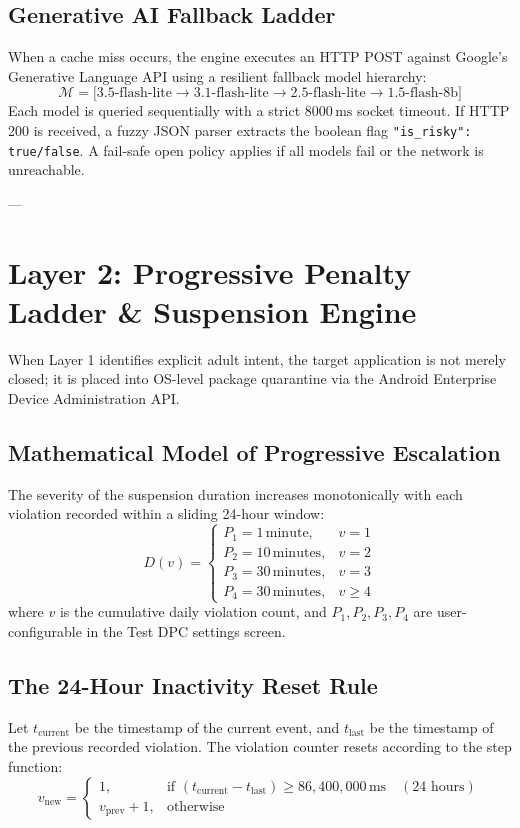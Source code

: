 \documentclass[11pt,a4paper]{article}
\begin{document}
\subsection{Generative AI Fallback Ladder}
When a cache miss occurs, the engine executes an HTTP POST against Google's Generative Language API using a resilient fallback model hierarchy:
\begin{equation}
\mathcal{M} = \big[ \text{3.5-flash-lite} \longrightarrow \text{3.1-flash-lite} \longrightarrow \text{2.5-flash-lite} \longrightarrow \text{1.5-flash-8b} \big]
\end{equation}
Each model is queried sequentially with a strict $8000\,\text{ms}$ socket timeout. If HTTP 200 is received, a fuzzy JSON parser extracts the boolean flag \texttt{"is\_risky": true/false}. A fail-safe open policy applies if all models fail or the network is unreachable.

---

\section{Layer 2: Progressive Penalty Ladder \& Suspension Engine}

When Layer 1 identifies explicit adult intent, the target application is not merely closed; it is placed into OS-level package quarantine via the Android Enterprise Device Administration API.

\subsection{Mathematical Model of Progressive Escalation}
The severity of the suspension duration increases monotonically with each violation recorded within a sliding 24-hour window:
\begin{equation}
D(v) = 
\begin{cases}
P_1 = 1\,\text{minute}, & v = 1 \\
P_2 = 10\,\text{minutes}, & v = 2 \\
P_3 = 30\,\text{minutes}, & v = 3 \\
P_4 = 30\,\text{minutes}, & v \ge 4
\end{cases}
\end{equation}
where $v$ is the cumulative daily violation count, and $P_1, P_2, P_3, P_4$ are user-configurable in the Test DPC settings screen.

\subsection{The 24-Hour Inactivity Reset Rule}
Let $t_{\text{current}}$ be the timestamp of the current event, and $t_{\text{last}}$ be the timestamp of the previous recorded violation. The violation counter resets according to the step function:
\begin{equation}
v_{\text{new}} = 
\begin{cases}
1, & \text{if } (t_{\text{current}} - t_{\text{last}}) \ge 86{,}400{,}000\,\text{ms} \quad (24\text{ hours}) \\
v_{\text{prev}} + 1, & \text{otherwise}
\end{cases}
\end{equation}
\end{document}
